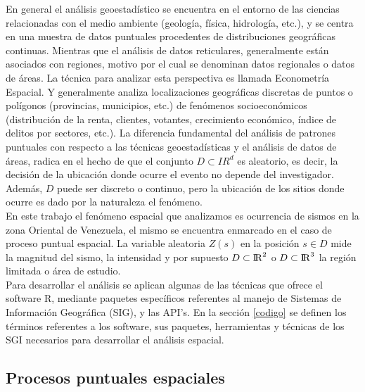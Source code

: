 \documentclass[12pt]{report}
\begin{document}
	
	
	
	
	En general el análisis geoestadístico se encuentra en el entorno de las ciencias relacionadas con el medio ambiente (geología, física, hidrología, etc.), y se centra en una muestra de datos puntuales procedentes de distribuciones geográficas continuas. Mientras que el análisis de datos reticulares, generalmente están asociados con regiones, motivo por el cual se denominan datos regionales o datos de áreas. La técnica para analizar esta perspectiva es llamada Econometría Espacial. Y generalmente analiza localizaciones geográficas discretas de puntos o polígonos (provincias, municipios, etc.) de fenómenos socioeconómicos (distribución de la renta, clientes, votantes, crecimiento económico, índice de delitos por sectores, etc.).  La diferencia fundamental del análisis de patrones puntuales con respecto a las técnicas geoestadísticas y el análisis de datos de áreas, radica en el hecho de que el conjunto $D \subset I\!\!R^d$ es aleatorio, es decir, la decisión de la ubicación donde  ocurre el evento no  depende del investigador. Además, $D$  puede ser discreto o continuo, pero la ubicación de los sitios donde ocurre es dado por la naturaleza el fenómeno. \\
	
	
	
	En este trabajo el fenómeno espacial que analizamos es ocurrencia de sismos en la zona Oriental de Venezuela, el mismo se encuentra enmarcado en el caso de proceso puntual espacial. La variable aleatoria $Z(s)$ en la posición $s \in D$ mide la magnitud del sismo, la intensidad y por supuesto  $D \subset{\rm I\!R}^{2}$  o  $D \subset {\rm I\!R}^{3}$  la región limitada o área  de estudio.\\
	
	Para desarrollar el análisis se aplican algunas de las técnicas  que ofrece el software R, mediante paquetes específicos referentes al manejo de Sistemas de Información  Geográfica  (SIG), y las API's.  
	En la sección \ref{codigo} se definen los términos referentes a los  software,  sus paquetes, herramientas y técnicas de los SGI necesarios para desarrollar el análisis espacial. \\
	
	
	\subsection{Procesos puntuales espaciales}
	
	
	
\end{document}
